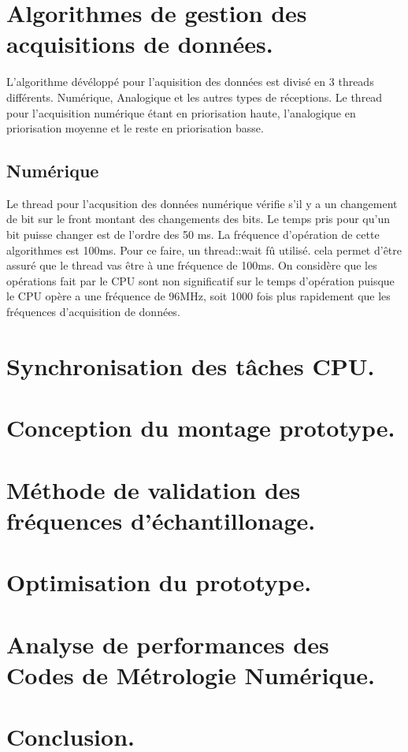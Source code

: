 \documentclass[12pt]{article}
\begin{document}
\section{Algorithmes de gestion des acquisitions de données.}
L'algorithme dévéloppé pour l'aquisition des données est divisé en 3 threads différents. Numérique, Analogique et les autres types de réceptions. Le thread pour l'acquisition numérique étant en priorisation haute, l'analogique en priorisation moyenne et le reste en priorisation basse.
\subsection{Numérique}
\noindent
Le thread pour l'acqusition des données numérique vérifie s'il y a un changement de bit sur le front montant des changements des bits. Le temps pris pour qu'un bit puisse changer est de l'ordre des 50 ms. La fréquence d'opération de cette algorithmes est 100ms. Pour ce faire, un thread::wait fû utilisé. cela permet d'être assuré que le thread vas être à une fréquence de 100ms. On considère que les opérations fait par le CPU sont non significatif sur le temps d'opération puisque le CPU opère a une fréquence de 96MHz, soit 1000 fois plus rapidement que les fréquences d'acquisition de données.
\section{Synchronisation des tâches CPU.}
\section{Conception du montage prototype.}
\section{Méthode de validation des fréquences d'échantillonage.}
\section{Optimisation du prototype.}
\section{Analyse de performances des Codes de Métrologie Numérique.}
\section{Conclusion.}
\end{document}

